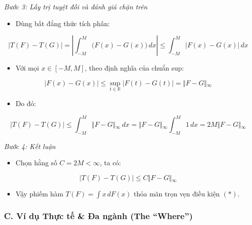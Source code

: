 \documentclass[12pt,a4paper]{article}
\begin{document}
\emph{Bước 3: Lấy trị tuyệt đối và đánh giá chặn trên}

\begin{itemize}

\item
  Dùng bất đẳng thức tích phân:
\end{itemize}

\[\vert{}T(F) - T(G)\vert{} = \left\vert{} \int_{-M}^M \big(F(x) - G(x)\big) \, dx \right\vert{} \le \int_{-M}^M \vert{}F(x) - G(x)\vert{} \, dx\]

\begin{itemize}

\item
  Với mọi \(x \in [-M, M]\), theo định nghĩa của chuẩn sup:
\end{itemize}

\[\vert{}F(x) - G(x)\vert{} \le \sup_{t \in \mathbb{R}} \vert{}F(t) - G(t)\vert{} = \Vert{}F - G\Vert{}_\infty\]

\begin{itemize}

\item
  Do đó:
\end{itemize}

\[\vert{}T(F) - T(G)\vert{} \le \int_{-M}^M \Vert{}F - G\Vert{}_\infty \, dx = \Vert{}F - G\Vert{}_\infty \int_{-M}^M 1 \, dx = 2M \Vert{}F - G\Vert{}_\infty\]

\emph{Bước 4: Kết luận}

\begin{itemize}

\item
  Chọn hằng số \(C = 2M < \infty\), ta có:
\end{itemize}

\[\vert{}T(F) - T(G)\vert{} \le C \Vert{}F - G\Vert{}_\infty\]

\begin{itemize}

\item
  Vậy phiếm hàm \(T(F) = \int x \, dF(x)\) thỏa mãn trọn vẹn điều kiện \((*)\).
\end{itemize}

\subsubsection{C. Ví dụ Thực tế \& Đa ngành (The ``Where'')}\label{c.-vuxed-dux1ee5-thux1ef1c-tux1ebf-ux111a-nguxe0nh-the-where-4}
\end{document}
